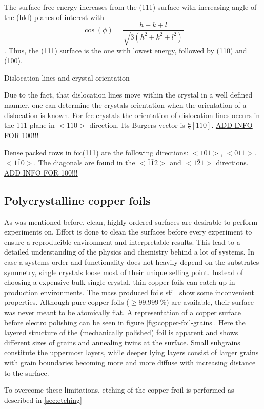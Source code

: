 The surface free energy increases from the (111) surface with increasing angle of the (hkl) planes of interest with $$\cos(\phi)=\frac{h+k+l}{\sqrt{3(h^2+k^2+l^2)}}$$ \cite{jian-min_calculation_2004}. Thus, the (111) surface is the one with lowest energy, followed by (110) and (100).


Dislocation lines and crystal orientation

Due to the fact, that dislocation lines move within the crystal in a well defined manner, one can determine the crystals orientation when the orientation of a dislocation is known.
For fcc crystals the orientation of dislocation lines occurs in the {111} plane in $<110>$ direction. Its Burgers vector is $\frac{a}{2}[110]$\cite{_dislocation-theory}. \underline{ADD INFO	FOR 100!!!}

 Dense packed rows in fcc(111) are the following directions: $<\bar 1 01>$, $<01\bar 1>$, $<1\bar 1 0>$. The diagonals are found in the $<\bar 1 \bar 1 2>$ and $<1\bar 2 1>$ directions. \underline{ADD INFO	FOR 100!!!}
 \subsection{Polycrystalline copper foils}
 As was mentioned before, clean, highly ordered surfaces are desirable to perform experiments on. Effort is done to clean the surfaces before every experiment to ensure a reproducible environment and interpretable results. This lead to a detailed understanding of the physics and chemistry behind a lot of systems. In case a systems order and functionality does not heavily depend on the substrates symmetry, single crystals loose most of their unique selling point. Instead of choosing a expensive bulk single crystal, thin copper foils can catch up in production environments. The mass produced foils still show some inconvenient properties. Although pure copper foils ($\geq \SI{99.999}{\percent}$) are available, their surface was never meant to be atomically flat. 
 A representation of a copper surface before electro polishing can be seen in figure \ref{fig:copper-foil-grains}. Here the layered structure of the (mechanically polished) foil is apparent and shows different sizes of grains and annealing twins at the surface. Small subgrains constitute the uppermost layers, while deeper lying layers consist of larger grains with grain boundaries becoming more and more diffuse with increasing distance to the surface.
 
To overcome these limitations, etching of the copper froil is performed as described in \autoref{sec:etching}